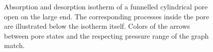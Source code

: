 \documentclass[../../thesis.tex]{subfiles}
\begin{document}
\begin{figure}[p]
{
    \label{fig:2b}}
    \caption{Absorption \protect{} and desorption \protect{} isotherm of a funnelled cylindrical pore open on the large end. The corresponding processes inside the pore are illustrated below the isotherm itself. Colors of the arrows between pore states and the respecting pressure range of the graph match.}
    \label{fig:closed-funnelled-cyl-pore-isos-cse}
\end{figure}
\end{document}
